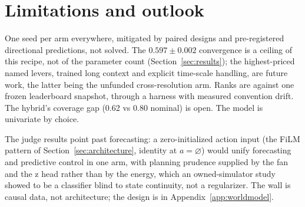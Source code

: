 \section{Limitations and outlook}
\label{sec:limitations}

One seed per arm everywhere, mitigated by paired designs and
pre-registered directional predictions, not solved. The
$0.597 \pm 0.002$ convergence is a ceiling of this recipe, not of the
parameter count (Section~\ref{sec:results}); the highest-priced named
levers, trained long context and explicit time-scale handling, are
future work, the latter being the unfunded cross-resolution arm. Ranks
are against one frozen leaderboard snapshot, through a harness with
measured convention drift. The hybrid's coverage gap (0.62 vs 0.80 nominal) is open. The
model is univariate by choice.

The judge results point past forecasting: a zero-initialized action
input (the FiLM pattern of Section~\ref{sec:architecture}, identity at
$a=\varnothing$) would unify forecasting and predictive control in one
arm, with planning prudence supplied by the fan and the z head rather
than by the energy, which an owned-simulator study showed to be a
classifier blind to state continuity, not a regularizer. The wall is
causal data, not architecture; the design is in
Appendix~\ref{app:worldmodel}.
